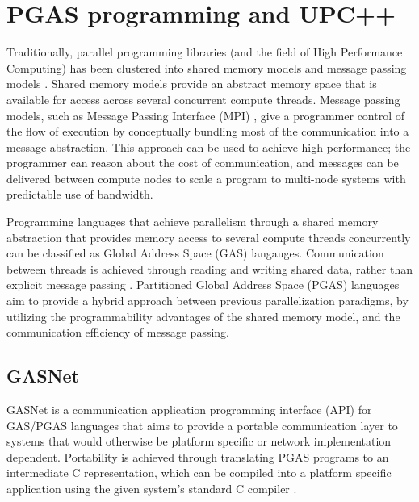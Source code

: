 \documentclass{uit-report}
\begin{document}

\newpage
\chapter{PGAS programming and UPC++}
Traditionally, parallel programming libraries (and the field of High Performance Computing) has been clustered into shared memory models and message passing models \cite{pgas_languages}. Shared memory models provide an abstract memory space that is available for access across several concurrent compute threads. Message passing models, such as Message Passing Interface (MPI) \cite{MPI}, give a programmer control of the flow of execution by conceptually bundling most of the communication into a message abstraction. This approach can be used to achieve high performance; the programmer can reason about the cost of communication, and messages can be delivered between compute nodes to scale a program to multi-node systems with predictable use of bandwidth.


Programming languages that achieve parallelism through a shared memory abstraction that provides memory access to several compute threads concurrently can be classified as Global Address Space (GAS) langauges. Communication between threads is achieved through reading and writing shared data, rather than explicit message passing \cite{gasnet_description}. Partitioned Global Address Space (PGAS) languages aim to provide a hybrid approach between previous parallelization paradigms, by utilizing the programmability advantages of the shared memory model, and the communication efficiency of message passing.

\section{GASNet}
GASNet is a communication application programming interface (API) for GAS/PGAS languages that aims to provide a portable communication layer to systems that would otherwise be platform specific or network implementation dependent. Portability is achieved through translating PGAS programs to an intermediate C representation, which can be compiled into a platform specific application using the given system's standard C compiler \cite{gasnet_description}.
\end{document}
